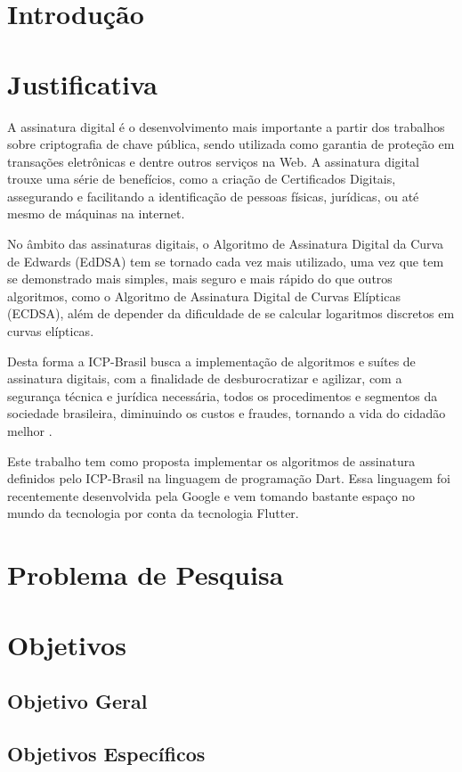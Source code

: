 \chapter[Introdução]{Introdução}



\chapter[Justificativa]{Justificativa}

A assinatura digital é o desenvolvimento mais importante a partir dos trabalhos sobre criptografia de chave pública, sendo utilizada como garantia de proteção em transações eletrônicas e dentre outros serviços na Web. A assinatura digital trouxe uma série de benefícios, como a criação de Certificados Digitais, assegurando e facilitando a identificação de pessoas físicas, jurídicas, ou até mesmo de máquinas na internet. 

No âmbito das assinaturas digitais, o Algoritmo de Assinatura Digital da Curva de Edwards (EdDSA) tem se tornado cada vez mais utilizado, uma vez que tem se demonstrado mais simples, mais seguro e mais rápido do que outros algoritmos, como o Algoritmo de Assinatura Digital de Curvas Elípticas (ECDSA), além de depender da dificuldade de se calcular logaritmos discretos em curvas elípticas. 

Desta forma a ICP-Brasil busca a implementação de algoritmos e suítes de assinatura digitais, com a finalidade de desburocratizar e agilizar, com a segurança técnica e jurídica necessária, todos os procedimentos e segmentos da sociedade brasileira, diminuindo os custos e fraudes, tornando a vida do cidadão melhor \cite{iti2018}.

Este trabalho tem como proposta implementar os algoritmos de assinatura definidos pelo ICP-Brasil na linguagem de programação Dart. Essa linguagem foi recentemente desenvolvida pela Google e vem tomando bastante espaço no mundo da tecnologia por conta da tecnologia Flutter. 

\chapter[Problema de Pesquisa]{Problema de Pesquisa}

\chapter[Objetivos]{Objetivos}

\section{Objetivo Geral}

\section{Objetivos Específicos}

